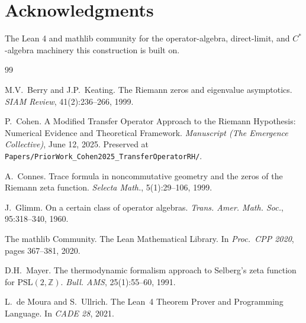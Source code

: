 \documentclass[11pt,a4paper]{amsart}
\theoremstyle{plain}
\theoremstyle{definition}
\begin{document}
\section*{Acknowledgments}

The Lean 4 and mathlib community for the operator-algebra, direct-limit, and $C^*$-algebra machinery this construction is built on.

\begin{thebibliography}{99}

M.V.~Berry and J.P.~Keating.
\newblock The Riemann zeros and eigenvalue asymptotics.
\newblock \emph{SIAM Review}, 41(2):236--266, 1999.

P.~Cohen.
\newblock A Modified Transfer Operator Approach to the Riemann Hypothesis: Numerical Evidence and Theoretical Framework.
\newblock \emph{Manuscript (The Emergence Collective)}, June 12, 2025. Preserved at \texttt{Papers/PriorWork\_Cohen2025\_TransferOperatorRH/}.

A.~Connes.
\newblock Trace formula in noncommutative geometry and the zeros of the Riemann zeta function.
\newblock \emph{Selecta Math.}, 5(1):29--106, 1999.

J.~Glimm.
\newblock On a certain class of operator algebras.
\newblock \emph{Trans. Amer. Math. Soc.}, 95:318--340, 1960.

The mathlib Community.
\newblock The Lean Mathematical Library.
\newblock In \emph{Proc.\ CPP 2020}, pages 367--381, 2020.

D.H.~Mayer.
\newblock The thermodynamic formalism approach to Selberg's zeta function for $\mathrm{PSL}(2,\mathbb{Z})$.
\newblock \emph{Bull. AMS}, 25(1):55--60, 1991.

L.~de Moura and S.~Ullrich.
\newblock The Lean~4 Theorem Prover and Programming Language.
\newblock In \emph{CADE 28}, 2021.

\end{thebibliography}
\end{document}
